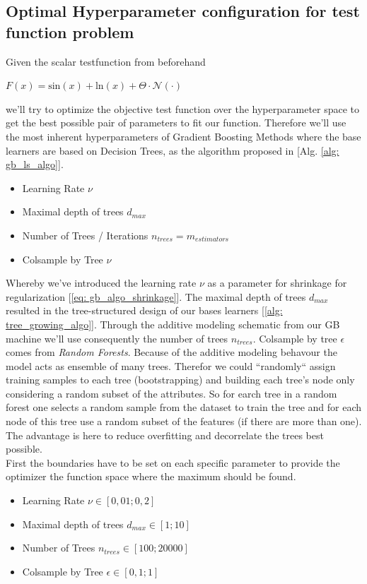 \documentclass[12pt, a4paper]{article}
\begin{document}
\subsection{Optimal Hyperparameter configuration for test function problem}
\label{sec: bayesian_opt_test}
Given the scalar testfunction from beforehand 
\begin{center}
    $F(x) = \text{sin}(x) + \text{ln}(x) + \Theta \cdot \mathcal{N}(\cdot)$
\end{center}
we'll try to optimize the objective test function over the hyperparameter space to get the best possible pair of parameters to fit our function. Therefore we'll use the most inherent hyperparameters of Gradient Boosting Methods where the base learners are based on Decision Trees, as the algorithm proposed in [Alg. \ref{alg: gb_ls_algo}]. 
\begin{itemize}
    \item Learning Rate $\nu$
    \item Maximal depth of trees $d_{max}$
    \item Number of Trees / Iterations $n_{trees} = m_{estimators}$
    \item Colsample by Tree $\nu$
\end{itemize}
Whereby we've introduced the learning rate $\nu$ as a parameter for shrinkage for regularization [\ref{eq: gb_algo_shrinkage}]. The maximal depth of trees $d_{max}$ resulted in the tree-structured design of our bases learners [\ref{alg: tree_growing_algo}]. Through the additive modeling schematic from our GB machine we'll use consequently the number of trees $n_{trees}$. Colsample by tree $\epsilon$ comes from \textit{Random Forests}. Because of the additive modeling behavour the model acts as ensemble of many trees. Therefor we could ``randomly`` assign training samples to each tree (bootstrapping)  and building each tree's node only considering a random subset of the attributes. So for earch tree in a random forest one selects a random sample from the dataset to train the tree and for each node of this tree use a random subset of the features (if there are more than one). The advantage is here to reduce overfitting and decorrelate the trees best possible.  \\
First the boundaries have to be set on each specific parameter to provide the optimizer the function space where the maximum should be found.
\begin{itemize}
    \item Learning Rate $\nu \in  [0,01 ; 0,2]$
    \item Maximal depth of trees $d_{max} \in [1; 10]$
    \item Number of Trees $n_{trees} \in [100; 20000]$
    \item Colsample by Tree $\epsilon \in [0,1; 1]$
\end{itemize}
\end{document}
